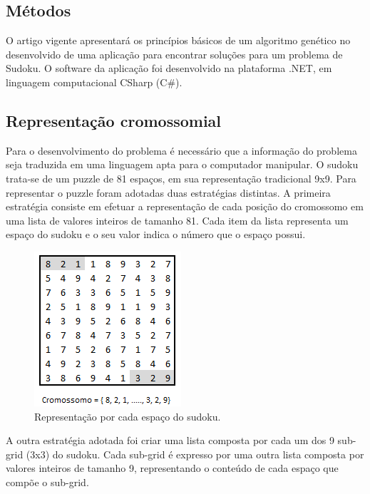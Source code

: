 \documentclass[twoside]{article}
\begin{document}
\begin{multicols}{2}

\section{Métodos}
O artigo vigente apresentará os princípios básicos de um algoritmo genético no desenvolvido de uma aplicação para encontrar soluções para um problema de Sudoku. O software da aplicação foi desenvolvido na plataforma .NET, em linguagem computacional CSharp (C\#).

\subsection{Representação cromossomial}
Para o desenvolvimento do problema é necessário que a informação do problema seja traduzida em uma linguagem apta para o computador manipular. O sudoku trata-se de um puzzle de 81 espaços, em sua representação tradicional 9x9. Para representar o puzzle foram adotadas duas estratégias distintas. A primeira estratégia consiste em efetuar a representação de cada posição do cromossomo em uma lista de valores inteiros de tamanho 81. Cada item da lista representa um espaço do sudoku e o seu valor indica o número que o espaço possui.

\begin{figure}[H]
  \caption{Representação por cada espaço do sudoku.}
  \centering
    \includegraphics[scale = 0.8]{sudoku_grid.png}
\end{figure}

A outra estratégia adotada foi criar uma lista composta por cada um dos 9 sub-grid (3x3) do sudoku. Cada sub-grid é expresso por uma outra lista composta por valores inteiros de tamanho 9, representando o conteúdo de cada espaço que compõe o sub-grid.


\end{multicols}
\end{document}
